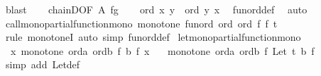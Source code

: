 \begin{isabellebody}
\ blast\isanewline
\ \ \isamarkupfalse%
\ chainD{\isacharbrackleft}{\kern0pt}OF\ A\ fg{\isacharbrackright}{\kern0pt}\isanewline
\ \ \isamarkupfalse%
\ {\isachardoublequoteopen}ord\ x\ y\ {\isasymor}\ ord\ y\ x{\isachardoublequoteclose}\ \isamarkupfalse%
\ fun{\isacharunderscore}{\kern0pt}ord{\isacharunderscore}{\kern0pt}def\ \isamarkupfalse%
\ auto\isanewline
{}\isamarkupfalse%
%
\endisatagproof
{\isafoldproof}%
%
\isadelimproof
\isanewline
%
\endisadelimproof
\isanewline
{}\isamarkupfalse%
\ call{\isacharunderscore}{\kern0pt}mono{\isacharbrackleft}{\kern0pt}partial{\isacharunderscore}{\kern0pt}function{\isacharunderscore}{\kern0pt}mono{\isacharbrackright}{\kern0pt}{\isacharcolon}{\kern0pt}\ {\isachardoublequoteopen}monotone\ {\isacharparenleft}{\kern0pt}fun{\isacharunderscore}{\kern0pt}ord\ ord{\isacharparenright}{\kern0pt}\ ord\ {\isacharparenleft}{\kern0pt}{\isasymlambda}f{\isachardot}{\kern0pt}\ f\ t{\isacharparenright}{\kern0pt}{\isachardoublequoteclose}\isanewline
%
\isadelimproof
%
\endisadelimproof
%
\isatagproof
{}\isamarkupfalse%
\ {\isacharparenleft}{\kern0pt}rule\ monotoneI{\isacharparenright}{\kern0pt}\ {\isacharparenleft}{\kern0pt}auto\ simp{\isacharcolon}{\kern0pt}\ fun{\isacharunderscore}{\kern0pt}ord{\isacharunderscore}{\kern0pt}def{\isacharparenright}{\kern0pt}%
\endisatagproof
{\isafoldproof}%
%
\isadelimproof
\isanewline
%
\endisadelimproof
\isanewline
{}\isamarkupfalse%
\ let{\isacharunderscore}{\kern0pt}mono{\isacharbrackleft}{\kern0pt}partial{\isacharunderscore}{\kern0pt}function{\isacharunderscore}{\kern0pt}mono{\isacharbrackright}{\kern0pt}{\isacharcolon}{\kern0pt}\isanewline
\ \ {\isachardoublequoteopen}{\isacharparenleft}{\kern0pt}{\isasymAnd}x{\isachardot}{\kern0pt}\ monotone\ orda\ ordb\ {\isacharparenleft}{\kern0pt}{\isasymlambda}f{\isachardot}{\kern0pt}\ b\ f\ x{\isacharparenright}{\kern0pt}{\isacharparenright}{\kern0pt}\isanewline
\ \ {\isasymLongrightarrow}\ monotone\ orda\ ordb\ {\isacharparenleft}{\kern0pt}{\isasymlambda}f{\isachardot}{\kern0pt}\ Let\ t\ {\isacharparenleft}{\kern0pt}b\ f{\isacharparenright}{\kern0pt}{\isacharparenright}{\kern0pt}{\isachardoublequoteclose}\isanewline
%
\isadelimproof
%
\endisadelimproof
%
\isatagproof
{}\isamarkupfalse%
\ {\isacharparenleft}{\kern0pt}simp\ add{\isacharcolon}{\kern0pt}\ Let{\isacharunderscore}{\kern0pt}def{\isacharparenright}{\kern0pt}%
\endisatagproof
{\isafoldproof}%
%
\isadelimproof
\isanewline
%
\endisadelimproof
\isanewline
{}\isamarkupfalse%

\end{isabellebody}
